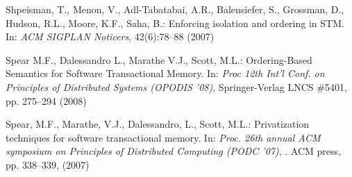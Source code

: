 \begin{thebibliography}{99}
{
 Shpeisman, T.,  Menon, V.,  Adl-Tabatabai, A.R.,  Balensiefer, S.,  Grossman, D.,
 Hudson, R.L., Moore, K.F., Saha, B.:
Enforcing isolation and ordering in STM. 
In: {\it ACM  SIGPLAN Noticers}, 42(6):78--88  (2007)

Spear M.F.,  Dalessandro L.,  Marathe V.J.,  Scott, M.L.:
Ordering-Based Semantics for Software Transactional Memory. 
In: {\it Proc  12th Int'l Conf. on Principles of Distributed Systems 
(OPODIS '08)},  Springer-Verlag LNCS \#5401, pp. 275--294 (2008) 

Spear, M.F.,  Marathe, V.J.,  Dalessandro, L.,  Scott, M.L.: 
Privatization techniques for software transactional memory. 
In: {\it Proc. 26th  annual ACM symposium on Principles of Distributed Computing 
(PODC '07)}, . ACM press, pp.  338--339, (2007)











}
\end{thebibliography}

